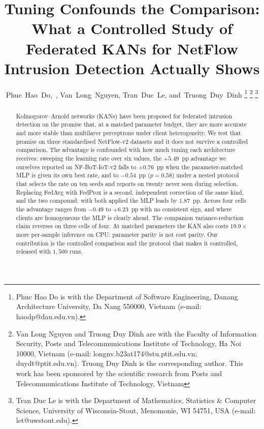 \documentclass[journal]{IEEEtran}
\begin{document}
\title{Tuning Confounds the Comparison: What a Controlled Study of\\
Federated KANs for NetFlow Intrusion Detection Actually Shows}

\author{Phuc~Hao~Do,~, Van~Long~Nguyen, Tran~Duc~Le,
        and~Truong~Duy~Dinh%
\thanks{Phuc Hao Do is with the Department of Software Engineering, Danang Architecture University, Da Nang 550000, Vietnam (e-mail: haodp@dau.edu.vn).}%
\thanks{Van Long Nguyen and Truong Duy Dinh are with the Faculty of Information Security, Posts and Telecommunications Institute of Technology, Ha Noi 10000, Vietnam (e-mail: longnv.b23at174@stu.ptit.edu.vn; duydt@ptit.edu.vn). Truong Duy Dinh is the corresponding author. This work has been sponsored by the scientific research from Posts and Telecommunications Institute of Technology, Vietnam}%
\thanks{Tran Duc Le is with the Department of Mathematics, Statistics \& Computer Science, University of Wisconsin-Stout, Menomonie, WI 54751, USA (e-mail: let@uwstout.edu).}%
}


\maketitle

\begin{abstract}
Kolmogorov--Arnold networks (KANs) have been proposed for federated intrusion detection on the
promise that, at a matched parameter budget, they are more accurate and more stable than
multilayer perceptrons under client heterogeneity. We test that promise on three standardised
NetFlow-v2 datasets and it does not survive a controlled comparison. The advantage is confounded
with how much tuning each architecture receives: sweeping the learning rate over six values, the
$+5.49$~pp advantage we ourselves reported on NF-BoT-IoT-v2 falls to $+0.76$~pp when the
parameter-matched MLP is given its own best rate, and to $-0.54$~pp ($p=0.58$) under a nested
protocol that selects the rate on ten seeds and reports on twenty never seen during selection.
Replacing FedAvg with FedProx is a second, independent correction of the same kind, and the two
compound: with both applied the MLP leads by $1.87$~pp. Across four cells the advantage ranges
from $-0.49$ to $+6.23$~pp with no consistent sign, and where clients are homogeneous the MLP is
clearly ahead. The companion variance-reduction claim reverses on three cells of four. At matched
parameters the KAN also costs $19.9\times$ more per-sample inference on CPU: parameter parity is
not cost parity. Our contribution is the controlled comparison and the protocol that makes it
controlled, released with $1{,}500$ runs.
\end{abstract}
\end{document}
